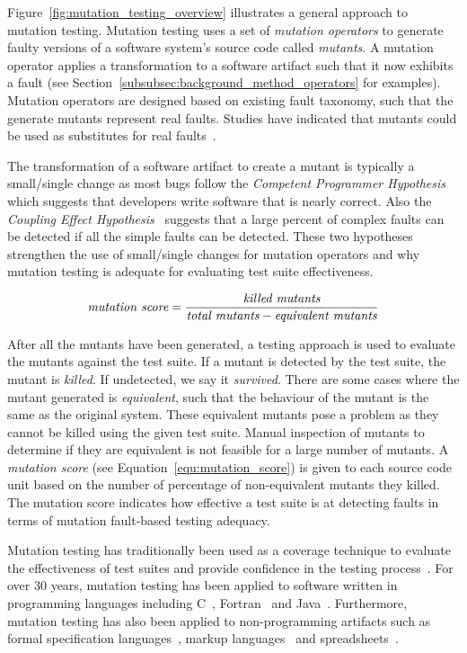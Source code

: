 Figure~\ref{fig:mutation_testing_overview} illustrates a general approach to mutation testing. Mutation testing uses a set of \emph{mutation operators} to generate faulty versions of a software system's source code called \emph{mutants}. A mutation operator applies a transformation to a software artifact such that it now exhibits a fault (see Section~\ref{subsubsec:background_method_operators} for examples). Mutation operators are designed based on existing fault taxonomy, such that the generate mutants represent real faults. Studies have indicated that mutants could be used as substitutes for real faults~\cite{ABLN06, ABL05, NK11}.

The transformation of a software artifact to create a mutant is typically a small/single change as most bugs follow the \emph{Competent Programmer Hypothesis}~\cite{ABD+79} which suggests that developers write software that is nearly correct. Also the \emph{Coupling Effect Hypothesis}~\cite{Off92} suggests that a large percent of complex faults can be detected if all the simple faults can be detected. These two hypotheses strengthen the use of small/single changes for mutation operators and why mutation testing is adequate for evaluating test suite effectiveness.

\begin{equation}
  \emph{$\text{mutation score} = \frac{\text{killed mutants}}{\text{total mutants} - \text{equivalent mutants}}$}
  \label{equ:mutation_score}
\end{equation}

After all the mutants have been generated, a testing approach is used to evaluate the mutants against the test suite. If a mutant is detected by the test suite, the mutant is \emph{killed}. If undetected, we say it \emph{survived}. There are some cases where the mutant generated is \emph{equivalent}, such that the behaviour of the mutant is the same as the original system. These equivalent mutants pose a problem as they cannot be killed using the given test suite. Manual inspection of mutants to determine if they are equivalent is not feasible for a large number of mutants. A \emph{mutation score} (see Equation~\ref{equ:mutation_score}) is given to each source code unit based on the number of percentage of non-equivalent mutants they killed. The mutation score indicates how effective a test suite is at detecting faults in terms of mutation fault-based testing adequacy.

Mutation testing has traditionally been used as a coverage technique to evaluate the effectiveness of test suites and provide confidence in the testing process~\cite{JH10}. For over 30 years, mutation testing has been applied to software written in programming languages including C~\cite{DM96, JH08}, Fortran~\cite{KO91} and Java~\cite{MKO02, BCD06}. Furthermore, mutation testing has also been applied to non-programming artifacts such as formal specification languages~\cite{ABM98}, markup languages~\cite{PO10} and spreadsheets~\cite{AE09}.

